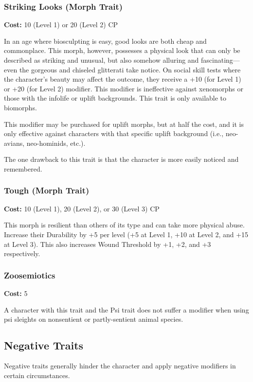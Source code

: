 \subsubsection{Striking Looks (Morph Trait)}
\textbf{Cost:} 10 (Level 1) or 20 (Level 2) CP

In an age where biosculpting is easy, good looks are both cheap and
commonplace. This morph, however, possesses a physical look that can only be
described as striking and unusual, but also somehow alluring and
fascinating—even the gorgeous and chiseled glitterati take notice. On social
skill tests where the character’s beauty may affect the outcome, they receive a
+10 (for Level 1) or +20 (for Level 2) modifier. This modifier is ineffective
against xenomorphs or those with the infolife or uplift backgrounds. This trait
is only available to biomorphs.

This modifier may be purchased for uplift morphs, but at half the cost, and it
is only effective against characters with that specific uplift background
(i.e., neo-avians, neo-hominids, etc.).

The one drawback to this trait is that the character is more easily noticed and
remembered.

\subsubsection{Tough (Morph Trait)}
\textbf{Cost:} 10 (Level 1), 20 (Level 2), or 30 (Level 3) CP

This morph is resilient than others of its type and can take more physical
abuse. Increase their Durability by +5 per level (+5 at Level 1, +10 at Level
2, and +15 at Level 3). This also increases Wound Threshold by +1, +2, and +3
respectively.

\subsubsection{Zoosemiotics}
\textbf{Cost:} 5

A character with this trait and the Psi trait does not suffer a modifier when
using psi sleights on nonsentient or partly-sentient animal species.

\subsection{Negative Traits}

Negative traits generally hinder the character and apply negative modifiers in
certain circumstances.

